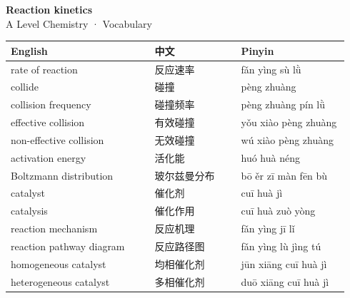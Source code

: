 \documentclass[11pt]{article}
\begin{document}
\begin{center}
  {\LARGE\bfseries Reaction kinetics}\\[0.35em]
  {\large A Level Chemistry · Vocabulary}
\end{center}
\vspace{0.6em}

\begin{longtable}{@{}p{0.40\linewidth}p{0.24\linewidth}p{0.30\linewidth}@{}}
\toprule
\textbf{English} & \textbf{中文} & \textbf{Pinyin} \\
\midrule
\endhead
\bottomrule
\endlastfoot
rate of reaction & 反应速率 & fǎn yìng sù lǜ \\
collide & 碰撞 & pèng zhuàng \\
collision frequency & 碰撞频率 & pèng zhuàng pín lǜ \\
effective collision & 有效碰撞 & yǒu xiào pèng zhuàng \\
non-effective collision & 无效碰撞 & wú xiào pèng zhuàng \\
activation energy & 活化能 & huó huà néng \\
Boltzmann distribution & 玻尔兹曼分布 & bō ěr zī màn fēn bù \\
catalyst & 催化剂 & cuī huà jì \\
catalysis & 催化作用 & cuī huà zuò yòng \\
reaction mechanism & 反应机理 & fǎn yìng jī lǐ \\
reaction pathway diagram & 反应路径图 & fǎn yìng lù jìng tú \\
homogeneous catalyst & 均相催化剂 & jūn xiāng cuī huà jì \\
heterogeneous catalyst & 多相催化剂 & duō xiāng cuī huà jì \\
\end{longtable}
\end{document}
